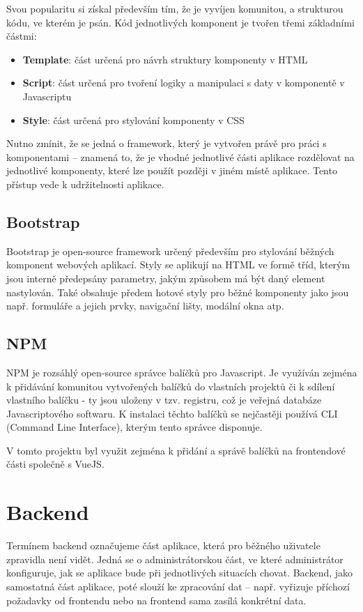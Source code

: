 	Svou popularitu si získal především tím, že je vyvíjen komunitou, a strukturou kódu, ve kterém je psán. Kód jednotlivých komponent je tvořen třemi základními částmi:
	
	\begin{itemize}
		\item \textbf{Template}: část určená pro návrh struktury komponenty v HTML
		\item \textbf{Script}: část určená pro tvoření logiky a manipulaci s daty v komponentě v Javascriptu
		\item \textbf{Style}: část určená pro stylování komponenty v CSS
	\end{itemize}

	Nutno zmínit, že se jedná o framework, který je vytvořen právě pro práci s komponentami – znamená to, že je vhodné jednotlivé části aplikace rozdělovat na jednotlivé komponenty, které lze použít později v jiném místě aplikace. Tento přístup vede k udržitelnosti aplikace. \cite{VueJSSyntax} \cite{VueJS2}
	
	\subsection{Bootstrap}
	Bootstrap je open-source framework určený především pro stylování běžných komponent webových aplikací. Styly se aplikují na HTML ve formě tříd, kterým jsou interně předepsány parametry, jakým způsobem má být daný element nastylován. Také obsahuje předem hotové styly pro běžné komponenty jako jsou např. formuláře a jejich prvky, navigační lišty, modální okna atp. \cite{Bootstrap1}  \cite{Bootstrap2}  \cite{Bootstrap3}
	
	\subsection{NPM}\label{sec:npm}
	NPM je rozsáhlý open-source správce balíčků pro Javascript. Je využíván zejména k přidávání komunitou vytvořených balíčků do vlastních projektů či k sdílení vlastního balíčku - ty jsou uloženy v tzv. registru, což je veřejná databáze Javascriptového softwaru. K instalaci těchto balíčků se nejčastěji používá CLI (Command Line Interface), kterým tento správce disponuje. \cite{NPM}
	
	V tomto projektu byl využit zejména k přidání a správě balíčků na frontendové části společně s VueJS.

\section{Backend}
Termínem backend označujeme část aplikace, která pro běžného uživatele zpravidla není vidět. Jedná se o administrátorskou část, ve které administrátor konfiguruje, jak se aplikace bude při jednotlivých situacích chovat. Backend, jako samostatná část aplikace, poté slouží ke zpracování dat – např. vyřizuje příchozí požadavky od frontendu nebo na frontend sama zasílá konkrétní data.

